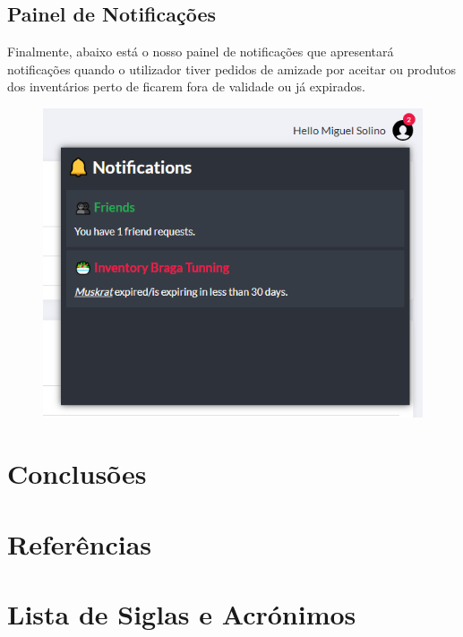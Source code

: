 \documentclass[a4paper]{report}
\begin{document}
    \section{Painel de Notificações}

    Finalmente, abaixo está o nosso painel de notificações que apresentará
    notificações quando o utilizador tiver pedidos de amizade por aceitar
    ou produtos dos inventários perto de ficarem fora de validade ou 
    já expirados.

    \begin{figure}[H]
        \centering
            \includegraphics[width=\textwidth]{images/produto_final/notificacoes.png}
    \end{figure}

\chapter{Conclusões}

\chapter{Referências}

\chapter{Lista de Siglas e Acrónimos}
\end{document}
